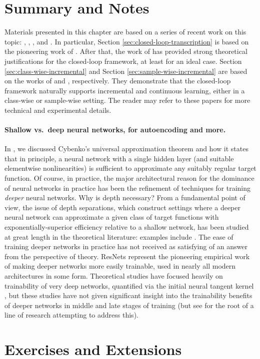 \documentclass[../../book-main.tex]{subfiles}
\begin{document}
\section{Summary and Notes}
Materials presented in this chapter are based on a series of recent work on this topic: \cite{Dai-entropy-2022}, 
\cite{pai2022pursuit}, \cite{tong2023incremental}, and \cite{pmlr-v234-tong24a}. In particular, Section \ref{sec:closed-loop-transcription} is based on the pioneering work of \cite{Dai-entropy-2022}. After that, the work of \cite{pai2022pursuit} has provided strong theoretical justifications for the closed-loop framework, at least for an ideal case. Section \ref{sec:class-wise-incremental} and Section \ref{sec:sample-wise-incremental} are based on the works of \cite{tong2023incremental} and \cite{pmlr-v234-tong24a}, respectively. They demonstrate that the closed-loop framework naturally supports incremental and continuous learning, either in a class-wise or sample-wise setting. The reader may refer to these papers for more technical and experimental details.


\paragraph{Shallow vs.\ deep neural networks, for autoencoding and more.}
In , we discussed Cybenko's universal approximation
theorem and how it states that in principle, a neural network with a single
hidden layer (and suitable elementwise nonlinearities) is sufficient to
approximate any suitably regular target function. Of course, in practice, the
major architectural reason for the dominance of neural networks in practice has
been the refinement of techniques for training \textit{deeper} neural networks.
Why is depth necessary?
From a fundamental point of view, the issue of depth separations, which
construct settings where a deeper neural network can approximate a given class
of target functions with exponentially-superior efficiency relative to a shallow
network,
has been studied at great length in the theoretical literature:
examples include \cite{Telgarsky2016-sn,Bresler2020-xy,Venturi2021-qc}. 
The ease of training deeper
networks in practice has not received as satisfying of an answer from the
perspective of theory. 
ResNets \cite{he2016deep} represent the pioneering empirical work of
making deeper networks more easily trainable, used in nearly all modern
architectures in some form. Theoretical studies have focused heavily on
trainability of very deep networks, quantified via the initial neural tangent
kernel \cite{Buchanan2021-sj,Martens2021-cx}, but these studies have not given
significant insight into the trainability benefits of deeper networks in middle
and late stages of training (but see \cite{Yang2021-gw} for the root of a line
of research attempting to address this).

\section{Exercises and Extensions}
\end{document}
